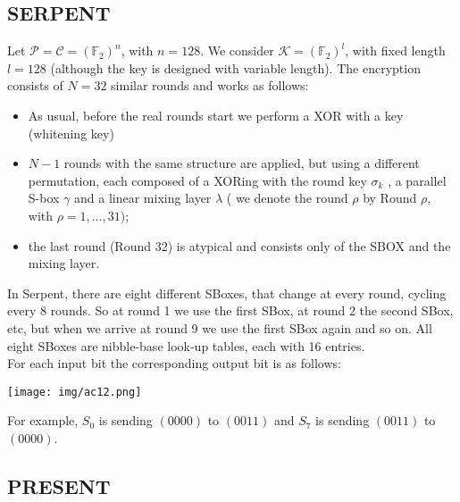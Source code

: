 \documentclass[a4paper, 10pt, titlepage]{article}
\begin{document}
\subsection{SERPENT}
Let $\mathcal{P} = \mathcal{C} = (\mathbb{F}_2)^n$, with $n = 128$. We consider $\mathcal{K} = (\mathbb{F}_2 )^l$, with fixed length $l = 128$ (although the key is designed with variable length).
The encryption consists of $N = 32$ similar rounds and works as follows:
\begin{itemize}
\item As usual, before the real rounds start we perform a XOR with a key (whitening key)
\item $N - 1$ rounds with the same structure are applied, but using a
different permutation, each composed of a XORing with the round key $\sigma_k$ , a parallel S-box $\gamma$ and a linear mixing layer $\lambda$ ( we denote the round $\rho$ by Round $\rho$, with $\rho = 1, \dots, 31)$;
\item the last round (Round 32) is atypical and consists only of the SBOX and the mixing layer.
\end{itemize}
In Serpent, there are eight different SBoxes, that change at every round, cycling every 8 rounds. So at round 1 we use the first SBox, at round 2 the second SBox, etc, but when we arrive at round 9 we use the first SBox again and so on. All eight SBoxes are nibble-base look-up tables, each with 16 entries. \\
For each input bit the corresponding output bit is as follows:
\begin{center}
\texttt{[image: img/ac12.png]}
\end{center}
For example, $S_0$ is sending $(0000)$ to $(0011)$ and $S_7$ is sending $(0011)$ to $(0000)$.

\subsection{PRESENT}
\end{document}
